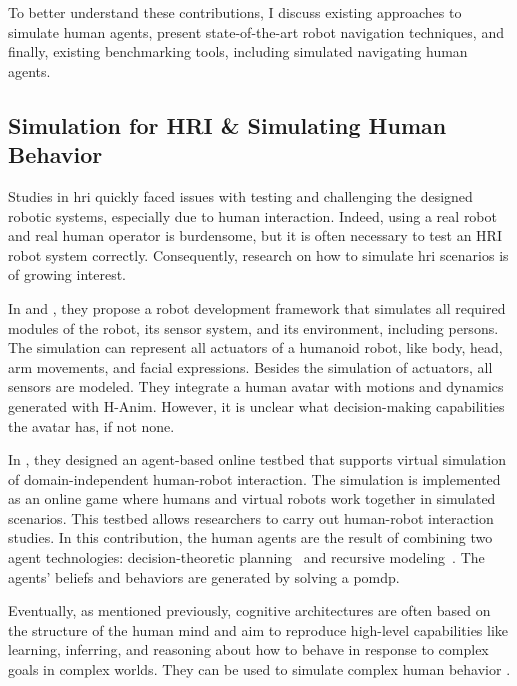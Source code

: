 To better understand these contributions, I discuss existing approaches to simulate human agents, present state-of-the-art robot navigation techniques, and finally, existing benchmarking tools, including simulated navigating human agents. 

\subsection{Simulation for HRI \& Simulating Human Behavior}

Studies in \acrshort{hri} quickly faced issues with testing and challenging the designed robotic systems, especially due to human interaction. Indeed, using a real robot and real human operator is burdensome, but it is often necessary to test an HRI robot system correctly. 
Consequently, research on how to 
simulate \acrshort{hri} scenarios is of growing interest. 

In \cite{schmitz_simulation_2010} and \cite{hirth_development_2011}, they propose a robot development framework that simulates all required modules of the robot, its sensor system, and its environment, including persons. The simulation can represent all actuators of a humanoid robot, like body, head, arm movements, and facial expressions. Besides the simulation of actuators, all sensors are modeled. They integrate a human avatar with motions and dynamics generated with H-Anim. However, it is unclear what decision-making capabilities the avatar has, if not none.

In \cite{shumaker_intelligent_2015}, they designed an agent-based online testbed that supports virtual simulation of domain-independent human-robot interaction. The simulation is implemented as an online game where humans and virtual robots work together in simulated scenarios. This testbed allows researchers to carry out human-robot interaction studies. In this contribution, the human agents are the result of combining two agent technologies: decision-theoretic planning~\cite{kaelbling_planning_1998} and recursive modeling~\cite{gmytrasiewicz_rigorous_1995}. The agents' beliefs and behaviors are generated by solving a \acrfull{pomdp}.

Eventually, as mentioned previously, cognitive architectures are often based on the structure of the human mind and aim to reproduce high-level capabilities like learning, inferring, and reasoning about how to behave in response to complex goals in complex worlds. They can be used to simulate complex human behavior .

